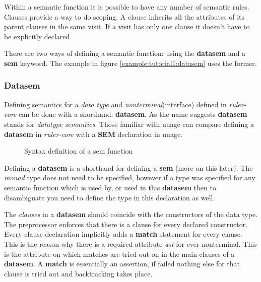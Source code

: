 \documentclass[twoside, titlepage, openright, a4paper]{book}
\newcommand{\Varid}[1]{\mathit{#1}}
\def\resethooks{%
  \global\let\SaveRestoreHook\empty
  \global\let\ColumnHook\empty}
\newcommand{\hsindent}[1]{\quad}%
\let\hspre\empty
\let\hspost\empty
\newcommand{\rcore}{\emph{ruler-core }}
\begin{document}
Within a semantic function it is possible to have any number of semantic rules. Clauses provide a way to do scoping. A clause inherits all the attributes of its parent clauses in the same visit. If a visit has only one clause it doesn't have to be explicitly declared. 

There are two ways of defining a semantic function: using the \textbf{datasem} and a \textbf{sem} keyword. The example in figure \ref{example:tutorial1:datasem} uses the former.

\subsubsection{Datasem}
Defining semantics for a \emph{data type} and \emph{nonterminal}(interface) defined in \rcore can be done with a shorthand: \textbf{datasem}. As the name suggests \textbf{datasem} stands for \emph{datatype semantics}. Those familiar with uuagc can compare defining a \textbf{datasem} in \rcore with a \textbf{SEM} declaration in uuagc.

\begin{figure}[!h]
\resethooks
\caption{Syntax definition of a sem function}
\label{datasem:syntax}
\end{figure}

Defining a \textbf{datasem} is a shorthand for defining a \textbf{sem} (more on this later). The \emph{monad} type does not need to be specified, however if a type was specified for any semantic function which is used by, or used in this \textbf{datasem} then to disambiguate you need to define the type in this declaration as well.

The \emph{clauses} in a \textbf{datasem} should coincide with the constructors of the data type. The preprocessor enforces that there is a clause for every declared constructor. Every clause declaration implicitly adds a \textbf{match} statement for every clause. This is the reason why there is a required attribute \emph{ast} for ever nonterminal. This is the attribute on which matches are tried out on in the main clauses of a \textbf{datasem}. A \textbf{match} is essentially an assertion, if failed nothing else for that clause is tried out and backtracking takes place.
\end{document}
